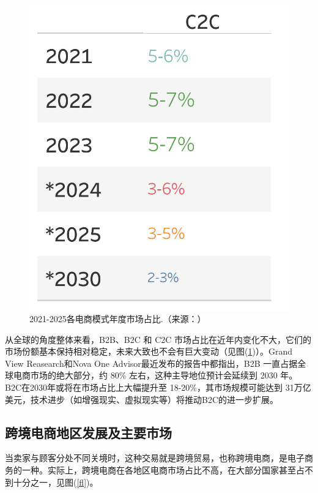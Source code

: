 \documentclass[12pt]{ctexart}
\begin{document}
\begin{figure}[htbp!]
\begin{minipage}{0.27\textwidth}
    \end{minipage}
    \hfill
    \begin{minipage}{0.26\textwidth}
        \centering
        \includegraphics[width=\textwidth]{Images/333_00.png}
    \end{minipage}
    \caption{2021-2025各电商模式年度市场占比.（来源：\cite{21,22}）}
    \label{all}
\end{figure}
从全球的角度整体来看，B2B、B2C 和 C2C 市场占比在近年内变化不大，它们的市场份额基本保持相对稳定，未来大致也不会有巨大变动（见图(\ref{all})）。Grand View Reasearch和Nova One Advisor最近发布的报告中都指出，B2B 一直占据全球电商市场的绝大部分，约 80\% 左右，这种主导地位预计会延续到 2030 年。B2C在2030年或将在市场占比上大幅提升至 18-20\%，其市场规模可能达到 31万亿美元，技术进步（如增强现实、虚拟现实等）将推动B2C的进一步扩展。


\subsection{跨境电商地区发展及主要市场}
当卖家与顾客分处不同关境时，这种交易就是跨境贸易，也称跨境电商，是电子商务的一种。实际上，跨境电商在各地区电商市场占比不高，在大部分国家甚至占不到十分之一，见图(\ref{fl})。
\end{document}
